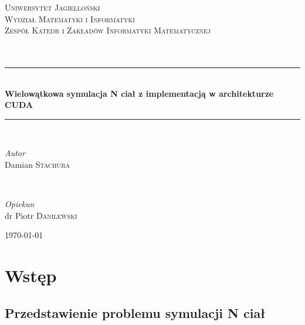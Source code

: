 \documentclass[13pt,twoside,a4paper]{article}
\begin{document}
\begin{titlepage}
	\newcommand{\HRule}{\rule{\linewidth}{0.5mm}}
	
	\center
	
	\textsc{\Large Uniwersytet  Jagielloński\\
			 Wydział Matematyki i Informatyki\\
    		 Zespół Katedr i Zakładów Informatyki Matematycznej}\\[1.5cm]
	
	\textsc{\Large}\\[0.5cm]
	
	\textsc{\Large}\\[0.5cm]
	
	\HRule\\[0.4cm]
		
	{\huge\bfseries Wielowątkowa symulacja N ciał z implementacją w architekturze CUDA}\\[0.4cm] %
	
	\HRule\\[1.5cm]
	
	\begin{minipage}{0.4\textwidth}
		\begin{flushleft}
			\large
			\textit{Autor}\\
			Damian \textsc{Stachura} %
		\end{flushleft}
	\end{minipage}
	~
	\begin{minipage}{0.4\textwidth}
		\begin{flushright}
			\large
			\textit{Opiekun}\\
			dr Piotr \textsc{Danilewski} %
		\end{flushright}
	\end{minipage}
	
	\vfill\vfill %
	
	{\large\today} %
	
\end{titlepage}

\newpage
\tableofcontents

\newpage

\section{\LARGE Wstęp}
\bigskip
\bigskip

\subsection{\Large Przedstawienie problemu symulacji N ciał}
\end{document}
